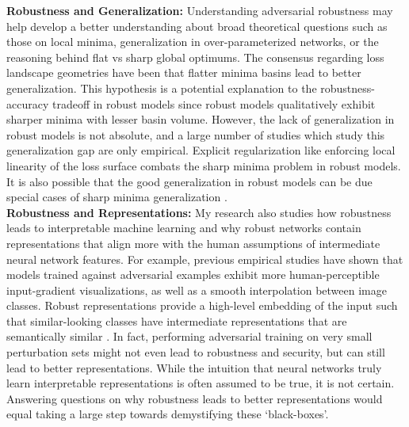 \documentclass[12pt]{article}
\begin{document}
\textbf{Robustness and Generalization:} Understanding adversarial robustness may help develop a better understanding about broad theoretical questions such as those on local minima, generalization in over-parameterized networks, or the reasoning behind flat vs sharp global optimums. The consensus regarding loss landscape geometries have been that flatter minima basins lead to better generalization. This hypothesis is a potential explanation to the robustness-accuracy tradeoff in robust models \cite{tsipras2018robustness} since robust models qualitatively exhibit sharper minima with lesser basin volume. 
However, the lack of generalization in robust models is not absolute, and a large number of studies which study this generalization gap are only empirical. Explicit regularization like enforcing local linearity of the loss surface combats the sharp minima problem in robust models. It is also possible that the good generalization in robust models can be due special cases of sharp minima generalization \cite{10.5555/3305381.3305487}.\\

\textbf{Robustness and Representations:} My research also studies how robustness leads to interpretable machine learning and why robust networks contain representations that align more with the human assumptions of intermediate neural network features. For example, previous empirical studies have shown that models trained against adversarial examples exhibit more human-perceptible input-gradient visualizations, as well as a smooth interpolation between image classes. Robust representations provide a high-level embedding of the input such that similar-looking classes have intermediate representations that are semantically similar \cite{engstrom2019adversarial}. In fact, performing adversarial training on very small perturbation sets might not even lead to robustness and security, but can still lead to better representations. While the intuition that neural networks truly learn interpretable representations is often assumed to be true, it is not certain. Answering questions on why robustness leads to better representations would equal taking a large step towards demystifying these `black-boxes'. \\

\end{document}
